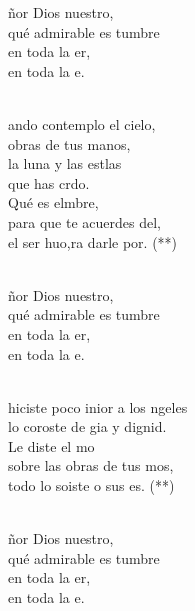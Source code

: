 \begin{cancion}%
	\begin{chorus}%
	ñor Dios nuestro,\\
	qué admirable es tumbre\\
	en toda la er,\\
	en toda la e.\\
	\end{chorus}%
	\jump\\
	ando contemplo el cielo,\\
obras de tus manos,\\
	la luna y las estlas\\
	que has crdo.\\
	Qué es elmbre,\\
	para que te acuerdes del, \\
	el ser huo,ra darle por. (**)\\\jump\\
	\begin{chorus}%
	ñor Dios nuestro,\\
	qué admirable es tumbre\\
	en toda la er,\\
	en toda la e.\\
	\end{chorus}%
	\jump\\
	 hiciste poco inior a los ngeles\\
	lo coroste de gia y dignid.\\
	Le diste el mo \\
	sobre las obras de tus mos,\\
	todo lo soiste o sus es. (**)\\\jump\\
	\begin{chorus}%
	ñor Dios nuestro,\\
	qué admirable es tumbre\\
	en toda la er,\\
	en toda la e.\\
	\end{chorus}%
	\jump\\
\end{cancion}%
